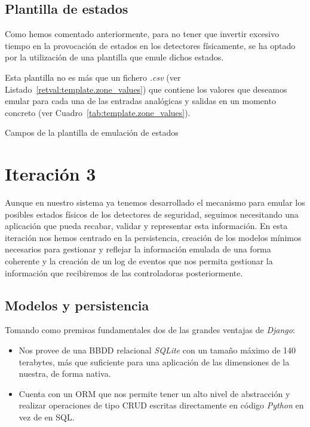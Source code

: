 \subsection{Plantilla de estados}

Como hemos comentado anteriormente, para no tener que invertir excesivo tiempo en la provocación de estados en los detectores físicamente, se ha optado por la utilización de una plantilla que emule dichos estados. 

Esta plantilla no es más que un fichero \textit{.csv} (ver Listado~\ref{retval:template.zone_values}) que contiene los valores que deseamos emular para cada una de las entradas analógicas y salidas en un momento concreto (ver Cuadro~\ref{tab:template.zone_values}).



\begin{table}[hp]
  \centering
  \centering
  \caption{Campos de la plantilla de emulación de estados}
  \label{tab:template.zone_values}
  {\small
  
  }
\end{table}


\section{Iteración 3}

Aunque en nuestro sistema ya tenemos desarrollado el mecanismo para emular los posibles estados físicos de los detectores de seguridad, seguimos necesitando una aplicación que pueda recabar, validar y representar esta información. En esta iteración nos hemos centrado en la persistencia, creación de los modelos mínimos necesarios para gestionar y reflejar la información emulada de una forma coherente y la creación de un log de eventos que nos permita gestionar la información que recibiremos de las controladoras posteriormente.

\subsection{Modelos y persistencia}

Tomando como premisas fundamentales dos de las grandes ventajas de \textit{Django}:

\begin{itemize}
\item Nos provee de una \acs{BBDD} relacional \textit{SQLite} con un tamaño máximo de 140 terabytes, más que suficiente para una aplicación de las dimensiones de la nuestra, de forma nativa.

\item Cuenta con un \acf{ORM} que nos permite tener un alto nivel de abstracción y realizar operaciones de tipo \acs{CRUD} escritas directamente en código \textit{Python} en vez de en \acs{SQL}.

\end{itemize}

